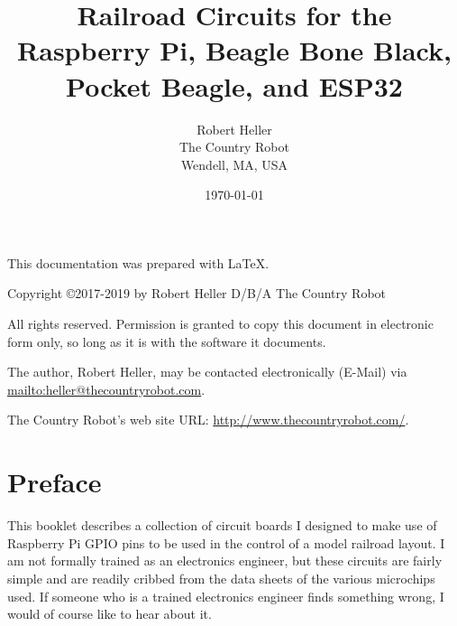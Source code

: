 \documentclass[12pt,notitlepage,twoside]{book}
\begin{document}
\title{Railroad Circuits for the Raspberry Pi, Beagle Bone Black, Pocket Beagle, and ESP32}
\author{Robert Heller \\ The Country Robot \\ Wendell, MA, USA}
\date{\today}
\begin{titlepage}

\maketitle

\clearpage

This documentation was prepared with \LaTeX.

\vspace{.25in}


{\small Copyright \copyright 2017-2019 by Robert Heller D/B/A The Country Robot}
\vspace{.25in}

All rights reserved.  Permission is granted to copy this document in
electronic form only, so long as it is with the software it
documents. 

\vspace{.125in}

The author, Robert Heller, may be contacted electronically (E-Mail) via
\url{mailto:heller@thecountryrobot.com}.

\vspace{.25in}

The Country Robot's web site URL: \url{http://www.thecountryrobot.com/}.

\thispagestyle{empty}
\setcounter{page}{0}
\clearpage

\end{titlepage}

\tableofcontents
\listoffigures
\listoftables
\cleardoublepage
\chapter*{Preface}

This booklet describes a collection of circuit boards I designed to make use 
of Raspberry Pi GPIO pins to be used in the control of a model railroad 
layout.  I am not formally trained as an electronics engineer, but these 
circuits are fairly simple and are readily cribbed from the data sheets of the 
various microchips used.  If someone who is a trained electronics engineer 
finds something wrong, I would of course like to hear about it.
\end{document}

